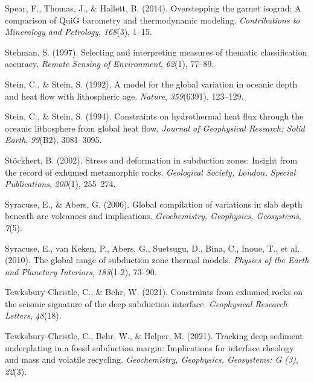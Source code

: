 \begin{CSLReferences}{1}{1}
\leavevmode{}%
Spear, F., Thomas, J., \& Hallett, B. (2014). Overstepping the garnet isograd: A comparison of QuiG barometry and thermodynamic modeling. \emph{Contributions to Mineralogy and Petrology}, \emph{168}(3), 1--15.

\leavevmode{}%
Stehman, S. (1997). Selecting and interpreting measures of thematic classification accuracy. \emph{Remote Sensing of Environment}, \emph{62}(1), 77--89.

\leavevmode{}%
Stein, C., \& Stein, S. (1992). A model for the global variation in oceanic depth and heat flow with lithospheric age. \emph{Nature}, \emph{359}(6391), 123--129.

\leavevmode{}%
Stein, C., \& Stein, S. (1994). Constraints on hydrothermal heat flux through the oceanic lithosphere from global heat flow. \emph{Journal of Geophysical Research: Solid Earth}, \emph{99}(B2), 3081--3095.

\leavevmode{}%
Stöckhert, B. (2002). Stress and deformation in subduction zones: Insight from the record of exhumed metamorphic rocks. \emph{Geological Society, London, Special Publications}, \emph{200}(1), 255--274.

\leavevmode{}%
Syracuse, E., \& Abers, G. (2006). Global compilation of variations in slab depth beneath arc volcanoes and implications. \emph{Geochemistry, Geophysics, Geosystems}, \emph{7}(5).

\leavevmode{}%
Syracuse, E., van Keken, P., Abers, G., Suetsugu, D., Bina, C., Inoue, T., et al. (2010). The global range of subduction zone thermal models. \emph{Physics of the Earth and Planetary Interiors}, \emph{183}(1-2), 73--90.

\leavevmode{}%
Tewksbury-Christle, C., \& Behr, W. (2021). Constraints from exhumed rocks on the seismic signature of the deep subduction interface. \emph{Geophysical Research Letters}, \emph{48}(18).

\leavevmode{}%
Tewksbury-Christle, C., Behr, W., \& Helper, M. (2021). Tracking deep sediment underplating in a fossil subduction margin: Implications for interface rheology and mass and volatile recycling. \emph{Geochemistry, Geophysics, Geosystems: G (3)}, \emph{22}(3).


\end{CSLReferences}
